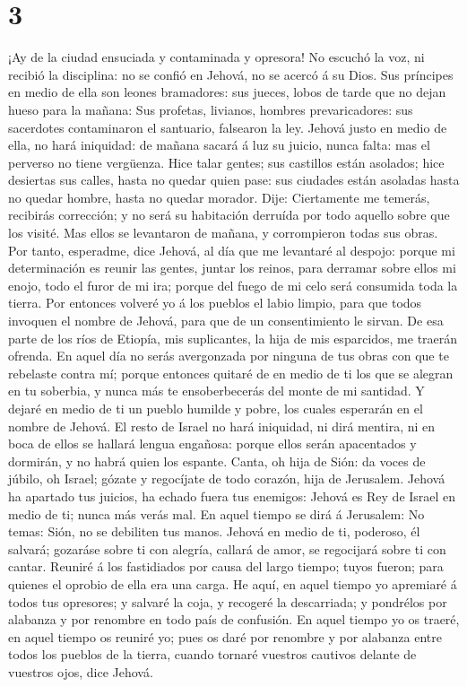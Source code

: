 \hypertarget{section-2}{%
\section{3}\label{section-2}}

 ¡Ay de la ciudad ensuciada y contaminada y opresora!
 No escuchó la voz, ni recibió la disciplina: no se confió
en Jehová, no se acercó á su Dios.  Sus príncipes en medio
de ella son leones bramadores: sus jueces, lobos de tarde que no dejan
hueso para la mañana:  Sus profetas, livianos, hombres
prevaricadores: sus sacerdotes contaminaron el santuario, falsearon la
ley.  Jehová justo en medio de ella, no hará iniquidad: de
mañana sacará á luz su juicio, nunca falta: mas el perverso no tiene
vergüenza.  Hice talar gentes; sus castillos están
asolados; hice desiertas sus calles, hasta no quedar quien pase: sus
ciudades están asoladas hasta no quedar hombre, hasta no quedar morador.
 Dije: Ciertamente me temerás, recibirás corrección; y no
será su habitación derruída por todo aquello sobre que los visité. Mas
ellos se levantaron de mañana, y corrompieron todas sus obras.
 Por tanto, esperadme, dice Jehová, al día que me
levantaré al despojo: porque mi determinación es reunir las gentes,
juntar los reinos, para derramar sobre ellos mi enojo, todo el furor de
mi ira; porque del fuego de mi celo será consumida toda la tierra.
 Por entonces volveré yo á los pueblos el labio limpio,
para que todos invoquen el nombre de Jehová, para que de un
consentimiento le sirvan.  De esa parte de los ríos de
Etiopía, mis suplicantes, la hija de mis esparcidos, me traerán ofrenda.
 En aquel día no serás avergonzada por ninguna de tus
obras con que te rebelaste contra mí; porque entonces quitaré de en
medio de ti los que se alegran en tu soberbia, y nunca más te
ensoberbecerás del monte de mi santidad.  Y dejaré en
medio de ti un pueblo humilde y pobre, los cuales esperarán en el nombre
de Jehová.  El resto de Israel no hará iniquidad, ni dirá
mentira, ni en boca de ellos se hallará lengua engañosa: porque ellos
serán apacentados y dormirán, y no habrá quien los espante.
 Canta, oh hija de Sión: da voces de júbilo, oh Israel;
gózate y regocíjate de todo corazón, hija de Jerusalem. 
Jehová ha apartado tus juicios, ha echado fuera tus enemigos: Jehová es
Rey de Israel en medio de ti; nunca más verás mal.  En
aquel tiempo se dirá á Jerusalem: No temas: Sión, no se debiliten tus
manos.  Jehová en medio de ti, poderoso, él salvará;
gozaráse sobre ti con alegría, callará de amor, se regocijará sobre ti
con cantar.  Reuniré á los fastidiados por causa del
largo tiempo; tuyos fueron; para quienes el oprobio de ella era una
carga.  He aquí, en aquel tiempo yo apremiaré á todos tus
opresores; y salvaré la coja, y recogeré la descarriada; y pondrélos por
alabanza y por renombre en todo país de confusión.  En
aquel tiempo yo os traeré, en aquel tiempo os reuniré yo; pues os daré
por renombre y por alabanza entre todos los pueblos de la tierra, cuando
tornaré vuestros cautivos delante de vuestros ojos, dice Jehová.
